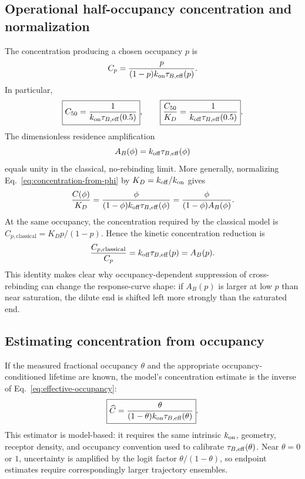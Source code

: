 \subsection{Operational half-occupancy concentration and normalization}

The concentration producing a chosen occupancy $p$ is
\begin{equation}
 C_p=\frac{p}{(1-p)k_{\mathrm{on}}\tau_{B,\mathrm{eff}}(p)}.
 \label{eq:Cp}
\end{equation}
In particular,
\begin{equation}
 \boxed{
 C_{50}=\frac{1}{k_{\mathrm{on}}\tau_{B,\mathrm{eff}}(0.5)}
 },
 \qquad
 \boxed{
 \frac{C_{50}}{K_D}=\frac{1}{k_{\mathrm{off}}\tau_{B,\mathrm{eff}}(0.5)}
 }.
 \label{eq:C50}
\end{equation}
The dimensionless residence amplification
\begin{equation}
 A_B(\phi)=k_{\mathrm{off}}\tau_{B,\mathrm{eff}}(\phi)
 \label{eq:residence-amplification}
\end{equation}
equals unity in the classical, no-rebinding limit.  More generally,
normalizing Eq.~\ref{eq:concentration-from-phi} by
$K_D=k_{\mathrm{off}}/k_{\mathrm{on}}$ gives
\begin{equation}
 \frac{C(\phi)}{K_D}
 =\frac{\phi}{(1-\phi)k_{\mathrm{off}}\tau_{B,\mathrm{eff}}(\phi)}
 =\frac{\phi}{(1-\phi)A_B(\phi)}.
 \label{eq:normalized-concentration}
\end{equation}
At the same occupancy, the concentration required by the classical model is
$C_{p,\mathrm{classical}}=K_Dp/(1-p)$.  Hence the kinetic concentration
reduction is
\begin{equation}
 \frac{C_{p,\mathrm{classical}}}{C_p}
 =k_{\mathrm{off}}\tau_{B,\mathrm{eff}}(p)=A_B(p).
 \label{eq:concentration-reduction}
\end{equation}
This identity makes clear why occupancy-dependent suppression of
cross-rebinding can change the response-curve shape: if $A_B(p)$ is larger at
low $p$ than near saturation, the dilute end is shifted left more strongly
than the saturated end.

\subsection{Estimating concentration from occupancy}

If the measured fractional occupancy $\theta$ and the appropriate
occupancy-conditioned lifetime are known, the model's concentration estimate
is the inverse of Eq.~\ref{eq:effective-occupancy}:
\begin{equation}
 \boxed{
 \widehat C
 =\frac{\theta}{(1-\theta)k_{\mathrm{on}}\tau_{B,\mathrm{eff}}(\theta)}
 }.
 \label{eq:estimated-concentration}
\end{equation}
This estimator is model-based: it requires the same intrinsic $k_{\mathrm{on}}$,
geometry, receptor density, and occupancy convention used to calibrate
$\tau_{B,\mathrm{eff}}(\theta)$.  Near $\theta=0$ or $1$, uncertainty is amplified by the
logit factor $\theta/(1-\theta)$, so endpoint estimates require correspondingly
larger trajectory ensembles.

